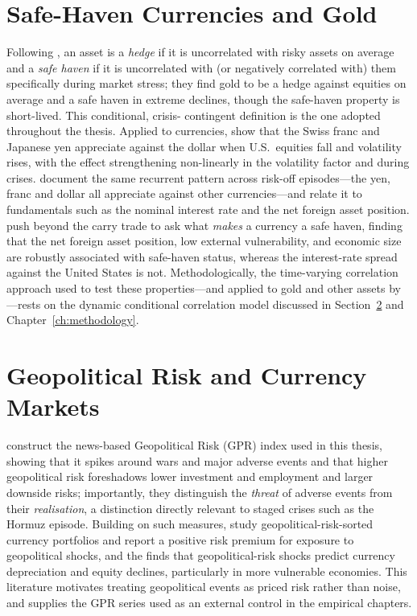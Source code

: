 \section{Safe-Haven Currencies and Gold}
\label{sec:lit_safe_haven}

Following \textcite{baur2010}, an asset is a \emph{hedge} if it is uncorrelated
with risky assets on average and a \emph{safe haven} if it is uncorrelated with
(or negatively correlated with) them specifically during market stress; they find
gold to be a hedge against equities on average and a safe haven in extreme
declines, though the safe-haven property is short-lived. This conditional, crisis-
contingent definition is the one adopted throughout the thesis. Applied to
currencies, \textcite{ranaldo2010} show that the Swiss franc and Japanese yen
appreciate against the dollar when U.S.\ equities fall and volatility rises, with
the effect strengthening non-linearly in the volatility factor and during crises.
\textcite{debock2015} document the same recurrent pattern across risk-off
episodes---the yen, franc and dollar all appreciate against other currencies---and
relate it to fundamentals such as the nominal interest rate and the net foreign
asset position. \textcite{habib2012} push beyond the carry trade to ask what
\emph{makes} a currency a safe haven, finding that the net foreign asset position,
low external vulnerability, and economic size are robustly associated with
safe-haven status, whereas the interest-rate spread against the United States is
not. Methodologically, the time-varying correlation approach used to test these
properties---and applied to gold and other assets by \textcite{kumar2025}---rests
on the dynamic conditional correlation model discussed in Section~\ref{sec:lit_gpr}
and Chapter~\ref{ch:methodology}.


\section{Geopolitical Risk and Currency Markets}
\label{sec:lit_gpr}

\textcite{caldara2022} construct the news-based Geopolitical Risk (GPR) index used
in this thesis, showing that it spikes around wars and major adverse events and
that higher geopolitical risk foreshadows lower investment and employment and
larger downside risks; importantly, they distinguish the \emph{threat} of adverse
events from their \emph{realisation}, a distinction directly relevant to staged
crises such as the Hormuz episode. Building on such measures, \textcite{liu2024}
study geopolitical-risk-sorted currency portfolios and report a positive risk
premium for exposure to geopolitical shocks, and the \textcite{imf2025gfsr} finds
that geopolitical-risk shocks predict currency depreciation and equity declines,
particularly in more vulnerable economies. This literature motivates treating
geopolitical events as priced risk rather than noise, and supplies the GPR series
used as an external control in the empirical chapters.


